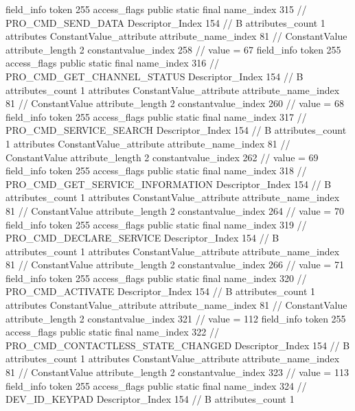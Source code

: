 {{{{{			}
			field_info {
				token	255
				access_flags	public static final
				name_index	315		// PRO_CMD_SEND_DATA
				Descriptor_Index	154		// B
				attributes_count	1
				attributes {
				ConstantValue_attribute {
					attribute_name_index	81		// ConstantValue
					attribute_length	2
					constantvalue_index	258		// value = 67
				}
				}
			}
			field_info {
				token	255
				access_flags	public static final
				name_index	316		// PRO_CMD_GET_CHANNEL_STATUS
				Descriptor_Index	154		// B
				attributes_count	1
				attributes {
				ConstantValue_attribute {
					attribute_name_index	81		// ConstantValue
					attribute_length	2
					constantvalue_index	260		// value = 68
				}
				}
			}
			field_info {
				token	255
				access_flags	public static final
				name_index	317		// PRO_CMD_SERVICE_SEARCH
				Descriptor_Index	154		// B
				attributes_count	1
				attributes {
				ConstantValue_attribute {
					attribute_name_index	81		// ConstantValue
					attribute_length	2
					constantvalue_index	262		// value = 69
				}
				}
			}
			field_info {
				token	255
				access_flags	public static final
				name_index	318		// PRO_CMD_GET_SERVICE_INFORMATION
				Descriptor_Index	154		// B
				attributes_count	1
				attributes {
				ConstantValue_attribute {
					attribute_name_index	81		// ConstantValue
					attribute_length	2
					constantvalue_index	264		// value = 70
				}
				}
			}
			field_info {
				token	255
				access_flags	public static final
				name_index	319		// PRO_CMD_DECLARE_SERVICE
				Descriptor_Index	154		// B
				attributes_count	1
				attributes {
				ConstantValue_attribute {
					attribute_name_index	81		// ConstantValue
					attribute_length	2
					constantvalue_index	266		// value = 71
				}
				}
			}
			field_info {
				token	255
				access_flags	public static final
				name_index	320		// PRO_CMD_ACTIVATE
				Descriptor_Index	154		// B
				attributes_count	1
				attributes {
				ConstantValue_attribute {
					attribute_name_index	81		// ConstantValue
					attribute_length	2
					constantvalue_index	321		// value = 112
				}
				}
			}
			field_info {
				token	255
				access_flags	public static final
				name_index	322		// PRO_CMD_CONTACTLESS_STATE_CHANGED
				Descriptor_Index	154		// B
				attributes_count	1
				attributes {
				ConstantValue_attribute {
					attribute_name_index	81		// ConstantValue
					attribute_length	2
					constantvalue_index	323		// value = 113
				}
				}
			}
			field_info {
				token	255
				access_flags	public static final
				name_index	324		// DEV_ID_KEYPAD
				Descriptor_Index	154		// B
				attributes_count	1
}}}}}
